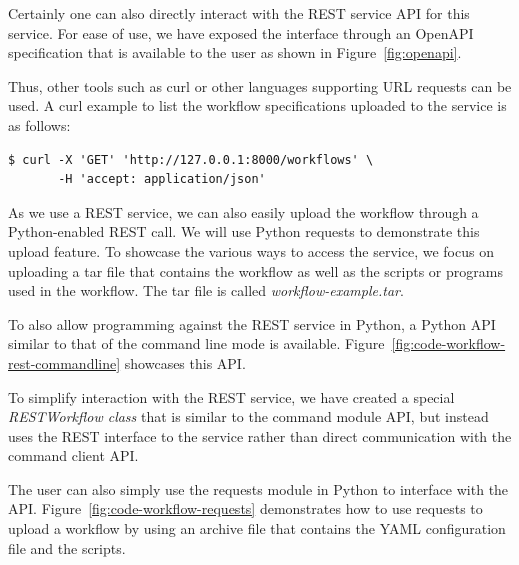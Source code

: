 Certainly one can also directly interact with the REST service API for
this service. For ease of use, we have exposed the interface through
an OpenAPI specification that is available to the user as shown in
Figure~\ref{fig:openapi}.

Thus, other tools such as curl or other languages supporting URL
requests can be used. A curl example to list the workflow
specifications uploaded to the service is as follows:

{\scriptsize
\begin{verbatim}
$ curl -X 'GET' 'http://127.0.0.1:8000/workflows' \
       -H 'accept: application/json'
\end{verbatim}}

As we use a REST service, we can also easily upload the workflow
through a Python-enabled REST call. We will use Python requests to
demonstrate this upload feature. To showcase the various ways to
access the service, we focus on uploading a tar file that contains the
workflow as well as the scripts or programs used in the workflow. The
tar file is called {\em workflow-example.tar}.

To also allow programming against the REST service in Python, a Python
API similar to that of the command line mode is
available. Figure~\ref{fig:code-workflow-rest-commandline} showcases
this API.

To simplify interaction with the REST service, we have created a special
{\em RESTWorkflow class} that is similar to the command module API,
but instead uses the REST interface to the service rather than direct
communication with the command client API.

The user can also simply use the requests module in Python to
interface with the API. Figure~\ref{fig:code-workflow-requests}
demonstrates how to use requests to upload a workflow by using an
archive file that contains the YAML configuration file and the
scripts.

